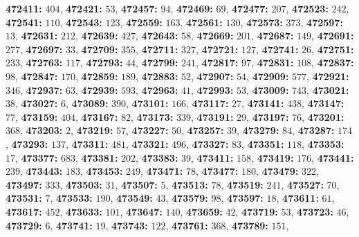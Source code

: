 \textsf{\bfseries 472411:} $404$, \textsf{\bfseries 472421:} $53$, \textsf{\bfseries 472457:} $94$, \textsf{\bfseries 472469:} $69$, \textsf{\bfseries 472477:} $207$, \textsf{\bfseries 472523:} $242$, \textsf{\bfseries 472541:} $110$, \textsf{\bfseries 472543:} $123$, \textsf{\bfseries 472559:} $163$, \textsf{\bfseries 472561:} $130$, \textsf{\bfseries 472573:} $373$, \textsf{\bfseries 472597:} $13$, \textsf{\bfseries 472631:} $212$, \textsf{\bfseries 472639:} $427$, \textsf{\bfseries 472643:} $58$, \textsf{\bfseries 472669:} $201$, \textsf{\bfseries 472687:} $149$, \textsf{\bfseries 472691:} $277$, \textsf{\bfseries 472697:} $33$, \textsf{\bfseries 472709:} $355$, \textsf{\bfseries 472711:} $327$, \textsf{\bfseries 472721:} $127$, \textsf{\bfseries 472741:} $26$, \textsf{\bfseries 472751:} $233$, \textsf{\bfseries 472763:} $117$, \textsf{\bfseries 472793:} $44$, \textsf{\bfseries 472799:} $241$, \textsf{\bfseries 472817:} $97$, \textsf{\bfseries 472831:} $108$, \textsf{\bfseries 472837:} $98$, \textsf{\bfseries 472847:} $170$, \textsf{\bfseries 472859:} $189$, \textsf{\bfseries 472883:} $52$, \textsf{\bfseries 472907:} $54$, \textsf{\bfseries 472909:} $577$, \textsf{\bfseries 472921:} $346$, \textsf{\bfseries 472937:} $63$, \textsf{\bfseries 472939:} $593$, \textsf{\bfseries 472963:} $41$, \textsf{\bfseries 472993:} $53$, \textsf{\bfseries 473009:} $743$, \textsf{\bfseries 473021:} $38$, \textsf{\bfseries 473027:} $6$, \textsf{\bfseries 473089:} $390$, \textsf{\bfseries 473101:} $166$, \textsf{\bfseries 473117:} $27$, \textsf{\bfseries 473141:} $438$, \textsf{\bfseries 473147:} $77$, \textsf{\bfseries 473159:} $404$, \textsf{\bfseries 473167:} $82$, \textsf{\bfseries 473173:} $339$, \textsf{\bfseries 473191:} $29$, \textsf{\bfseries 473197:} $76$, \textsf{\bfseries 473201:} $368$, \textsf{\bfseries 473203:} $2$, \textsf{\bfseries 473219:} $57$, \textsf{\bfseries 473227:} $50$, \textsf{\bfseries 473257:} $39$, \textsf{\bfseries 473279:} $84$, \textsf{\bfseries 473287:} $174$, \textsf{\bfseries 473293:} $137$, \textsf{\bfseries 473311:} $481$, \textsf{\bfseries 473321:} $496$, \textsf{\bfseries 473327:} $83$, \textsf{\bfseries 473351:} $118$, \textsf{\bfseries 473353:} $17$, \textsf{\bfseries 473377:} $683$, \textsf{\bfseries 473381:} $202$, \textsf{\bfseries 473383:} $39$, \textsf{\bfseries 473411:} $158$, \textsf{\bfseries 473419:} $176$, \textsf{\bfseries 473441:} $239$, \textsf{\bfseries 473443:} $183$, \textsf{\bfseries 473453:} $249$, \textsf{\bfseries 473471:} $78$, \textsf{\bfseries 473477:} $180$, \textsf{\bfseries 473479:} $322$, \textsf{\bfseries 473497:} $333$, \textsf{\bfseries 473503:} $31$, \textsf{\bfseries 473507:} $5$, \textsf{\bfseries 473513:} $78$, \textsf{\bfseries 473519:} $241$, \textsf{\bfseries 473527:} $70$, \textsf{\bfseries 473531:} $7$, \textsf{\bfseries 473533:} $190$, \textsf{\bfseries 473549:} $43$, \textsf{\bfseries 473579:} $98$, \textsf{\bfseries 473597:} $18$, \textsf{\bfseries 473611:} $61$, \textsf{\bfseries 473617:} $452$, \textsf{\bfseries 473633:} $101$, \textsf{\bfseries 473647:} $140$, \textsf{\bfseries 473659:} $42$, \textsf{\bfseries 473719:} $53$, \textsf{\bfseries 473723:} $46$, \textsf{\bfseries 473729:} $6$, \textsf{\bfseries 473741:} $19$, \textsf{\bfseries 473743:} $122$, \textsf{\bfseries 473761:} $368$, \textsf{\bfseries 473789:} $151$, 
